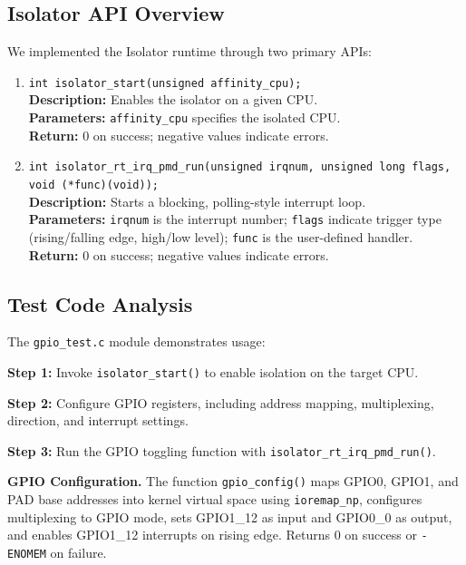 \documentclass[letterpaper]{article}
\begin{document}
\subsection{Isolator API Overview}
We implemented the Isolator runtime through two primary APIs:
\begin{enumerate}
    \item \texttt{int isolator\_start(unsigned affinity\_cpu);} \\
    \textbf{Description:} Enables the isolator on a given CPU. \\
    \textbf{Parameters:} \texttt{affinity\_cpu} specifies the isolated CPU. \\
    \textbf{Return:} 0 on success; negative values indicate errors.
    \item \texttt{int isolator\_rt\_irq\_pmd\_run(unsigned irqnum, unsigned long flags, void (*func)(void));} \\
    \textbf{Description:} Starts a blocking, polling-style interrupt loop. \\
    \textbf{Parameters:} \texttt{irqnum} is the interrupt number; \texttt{flags} indicate trigger
    type (rising/falling edge, high/low level); \texttt{func} is the user-defined handler. \\
    \textbf{Return:} 0 on success; negative values indicate errors.
\end{enumerate}

\subsection{Test Code Analysis}
The \texttt{gpio\_test.c} module demonstrates usage:
\begin{compactitem}
    \item \textbf{Step 1:} Invoke \texttt{isolator\_start()} to enable isolation on the target CPU.
    \item \textbf{Step 2:} Configure GPIO registers, including address mapping, multiplexing,
    direction, and interrupt settings.
    \item \textbf{Step 3:} Run the GPIO toggling function with \texttt{isolator\_rt\_irq\_pmd\_run()}.
\end{compactitem}

\textbf{GPIO Configuration.} The function \texttt{gpio\_config()} maps GPIO0, GPIO1, and PAD base
addresses into kernel virtual space using \texttt{ioremap\_np}, configures multiplexing to GPIO
mode, sets GPIO1\_12 as input and GPIO0\_0 as output, and enables GPIO1\_12 interrupts on rising
edge. Returns 0 on success or \texttt{-ENOMEM} on failure.
\end{document}
